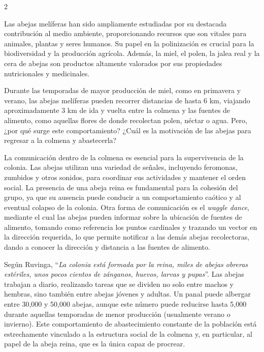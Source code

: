 \documentclass[12pt]{report}
\newenvironment{tightmulticols}{%
  \begin{multicols}{2}
  \setlength{\parskip}{1.2pt}
  \linespread{1}\selectfont
}{%
  \end{multicols}
}
\begin{document}
\begin{tightmulticols}

\noindent Las abejas melíferas han sido ampliamente estudiadas por su destacada contribución al medio ambiente, proporcionando recursos que son vitales para animales, plantas y seres humanos. Su papel en la polinización es crucial para la biodiversidad y la producción agrícola\cite{leon2023calidad}. Además, la miel, el polen, la jalea real y la cera de abejas son productos altamente valorados por sus propiedades nutricionales y medicinales\cite{winston1987temperate}.

\par Durante las temporadas de mayor producción de miel, como en primavera y verano, las abejas melíferas pueden recorrer distancias de hasta 6 km\cite{Beekman2000}, viajando aproximadamente 3 km de ida y vuelta entre la colmena y las fuentes de alimento, como aquellas flores de donde recolectan polen, néctar o agua. Pero, ¿por qué surge este comportamiento? ¿Cuál es la motivación de las abejas para regresar a la colmena y abastecerla?

\par La comunicación dentro de la colmena es esencial para la supervivencia de la colonia. Las abejas utilizan una variedad de señales, incluyendo feromonas, zumbidos y otros sonidos, para coordinar sus actividades y mantener el orden social\cite{winston1987temperate}. La presencia de una abeja reina es fundamental para la cohesión del grupo, ya que su ausencia puede conducir a un comportamiento caótico y al eventual colapso de la colonia\cite{ruvinga2021}. Otra forma de comunicación es el \textit{waggle dance}, mediante el cual las abejas pueden informar sobre la ubicación de fuentes de alimento, tomando como referencia los puntos cardinales y trazando un vector en la dirección requerida\cite{wang2025encoding}, lo que permite notificar a las demás abejas recolectoras, dando a conocer la dirección y distancia a las fuentes de alimento.

\par Según Ruvinga\cite{ruvinga2021}, ``\textit{La colonia está formada por la reina, miles de abejas obreras estériles, unos pocos cientos de zánganos, huevos, larvas y pupas}''. Las abejas trabajan a diario, realizando tareas que se dividen no solo entre machos y hembras, sino también entre abejas jóvenes y adultas\cite{johnson2010division}. Un panal puede albergar entre 30,000 y 50,000 abejas, aunque este número puede reducirse hasta 5,000 durante aquellas temporadas de menor producción (usualmente verano o invierno). Este comportamiento de abastecimiento constante de la población está estrechamente vinculado a la estructura social de la colmena y, en particular, al papel de la abeja reina, que es la única capaz de procrear\cite{ruvinga2021}.


\end{tightmulticols}
\end{document}
